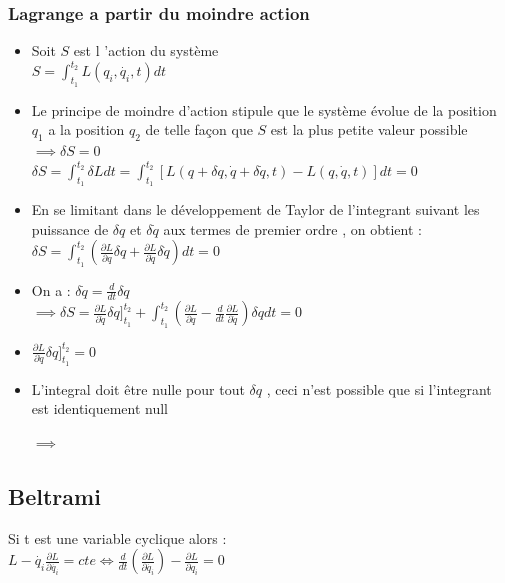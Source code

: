 \documentclass[12pt,oneside]{book}
\begin{document}
\subsubsection{Lagrange a partir du moindre action}
\begin{itemize}
	\item Soit $ S $ est l 'action du système \\
	      $ S = \int_{t_1}^{t_2}L(q_i,\dot{q_i},t)dt$
	\item Le principe de moindre d'action stipule que le système évolue de la position $ q_1 $ a la position $ q_2 $  de telle façon que $ S $ est la plus petite valeur possible $ \implies \delta S = 0 $ \\
	      $ \delta S = \int_{t_1}^{t_2} \delta L dt = \int_{t_1}^{t_2} \left[ L(q + \delta q , \dot{q} + \delta \dot{q} , t) - L ( q , \dot{q} , t) \right] dt =0  $
	\item En se limitant dans le développement de Taylor de l'integrant suivant les puissance de $ \delta q $ et $ \delta \dot{q} $ aux termes de premier ordre , on obtient : \\
	      $ \delta S = \int_{t_1}^{t_2} (\frac{\partial L}{\partial q}\delta q + \frac{\partial L}{\partial \dot{q}}\delta \dot{q})dt = 0 $
	\item  On a : $ \delta \dot{q} = \frac{d}{dt}\delta q  $ \\
	      $ \implies \delta S = \frac{\partial L}{\partial \dot{q}}\delta q ]^{t_2}_{t_1} + \int_{t_1}^{t_2} ( \frac{\partial L}{\partial q} - \frac{d}{dt}\frac{\partial L}{\partial \dot{q}})\delta q dt =0$
	\item $ \frac{\partial L}{\partial \dot{q}}\delta q ]^{t_2}_{t_1}  =0 $
	\item L'integral doit être nulle pour tout $ \delta q $ , ceci n'est possible que si l'integrant est identiquement null \\
	      \begin{center}
		      $ \implies  $ 
	      \end{center}
\end{itemize}
\subsection{Beltrami}
Si t est une variable cyclique alors : \\
$ L - \dot{q_i}\frac{\partial L}{\partial \dot{q_i}} = cte \Longleftrightarrow \frac{d}{dt}(\frac{\partial L}{\partial \dot{q_i}}) - \frac{\partial L}{\partial q_i} =0 $
\end{document}
